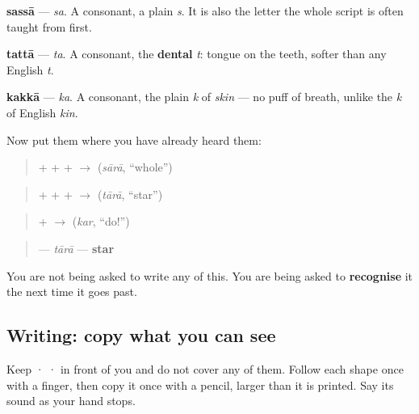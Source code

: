 \textbf{sassā} — \emph{sa}. A consonant, a plain \emph{s}. It is also the letter the whole script is often taught from first.

\begin{quote}
\end{quote}

\textbf{tattā} — \emph{ta}. A consonant, the \textbf{dental} \emph{t}: tongue on the teeth, softer than any English \emph{t}.

\begin{quote}
\end{quote}

\textbf{kakkā} — \emph{ka}. A consonant, the plain \emph{k} of \emph{skin} — no puff of breath, unlike the \emph{k} of English \emph{kin}.

Now put them where you have already heard them:

\begin{quote}
\textbf{} + \textbf{} + \textbf{} + \textbf{} $\to$ \textbf{} (\emph{sārā}, “whole”)
\end{quote}

\begin{quote}
\textbf{} + \textbf{} + \textbf{} + \textbf{} $\to$ \textbf{} (\emph{tārā}, “star”)
\end{quote}

\begin{quote}
\textbf{} + \textbf{} $\to$ \textbf{} (\emph{kar}, “do!”)
\end{quote}

\begin{quote}
\textbf{} — \emph{tārā} — \textbf{star}
\end{quote}

You are not being asked to write any of this. You are being asked to \textbf{recognise} it the next time it goes past.

\subsection*{Writing: copy what you can see}

Keep  ·  ·  in front of you and do not cover any of them. Follow each shape once with a finger, then copy it once with a pencil, larger than it is printed. Say its sound as your hand stops.

